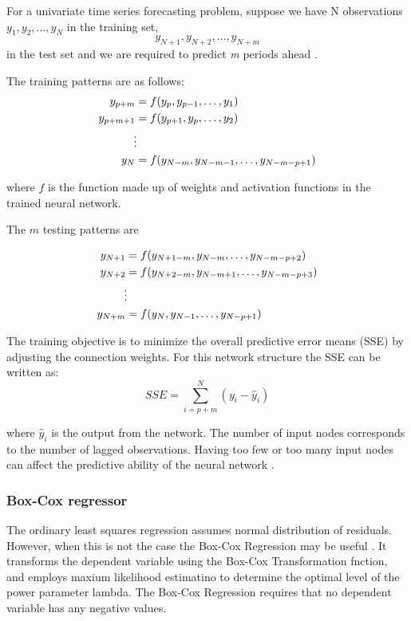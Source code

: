 \documentclass[final,3p,times,twocolumn,numbers]{elsarticle}
\begin{document}
For a univariate time series forecasting problem, suppose we have N observations $y_1, y_2, \ldots, y_N$ in the training set, 
\begin{equation}
y_{N+1}, y_{N+2}, \ldots, y_{N+m}
\end{equation}
\noindent in the test set and we are required to predict \textit{m} periods ahead \cite{Pao2007}. 

The training patterns are as follows:
\begin{align}
y_{p+m} & =f(y_p, y_{p-1},\ldots,y_1)\\
y_{p+m+1} & =f(y_{p+1}, y_{p},\ldots,y_2)\\
&\vdotswithin  \notag \\
y_{N} & =f(y_{N-m},y_{N-m-1},\ldots,y_{N-m-p+1})
\end{align}

\noindent where $f$ is the function made up of weights and activation functions in the trained neural network.

The $m$ testing patterns are 

\begin{align}
y_{N+1} & =f(y_{N+1-m}, y_{N-m},\ldots,y_{N-m-p+2})\\
y_{N+2} & =f(y_{N+2-m}, y_{N-m+1},\ldots,y_{N-m-p+3})\\
&\vdotswithin  \notag \\
y_{N+m} & =f(y_{N},y_{N-1},\ldots,y_{N-p+1})
\end{align}

The training objective is to minimize the overall predictive error means (SSE) by adjusting the connection weights. For this network structure the SSE can be written as:
\begin{equation}
SSE = \sum_{i=p+m}^N(y_i-\hat{y}_i)
\end{equation}

\noindent where $\hat{y}_i$ is the output from the network. The number of input nodes corresponds to the number of lagged observations. Having too few or too many input nodes can affect the predictive ability of the neural network \cite{Pao2007}.

\subsubsection{Box-Cox regressor}

The ordinary least squares regression assumes normal distribution of residuals. However, when this is not the case the Box-Cox Regression may be useful \cite{Box1964}. It transforms the dependent variable using the Box-Cox Transformation fnction, and employs maxium likelihood estimatino to determine the optimal level of the power parameter lambda. The Box-Cox Regression requires that no dependent variable has any negative values.
\end{document}
